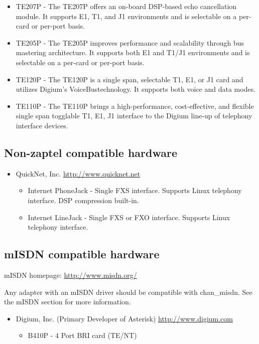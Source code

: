 \begin{itemize}
\begin{itemize}
\begin{itemize}
       \item TE207P - The TE207P offers an on-board DSP-based echo cancellation module. It supports E1, T1, and J1 environments and is selectable on a per-card or per-port basis.
       \item TE205P - The TE205P improves performance and scalability through bus mastering architecture. It supports both E1 and T1/J1 environments and is selectable on a per-card or per-port basis.
       \item TE120P - The TE120P is a single span, selectable T1, E1, or J1 card and utilizes Digium's VoiceBus\texttrademark technology. It supports both voice and data modes.       
       \item TE110P - The TE110P brings a high-performance, cost-effective, and flexible single span togglable T1, E1, J1 interface to the Digium line-up of telephony interface devices.
     \end{itemize}
  \end{itemize}
\end{itemize}

\subsection{Non-zaptel compatible hardware}

\begin{itemize}
  \item QuickNet, Inc. 
        \url{http://www.quicknet.net}
  \begin{itemize}
    \item Internet PhoneJack - Single FXS interface.  Supports Linux telephony
          interface.  DSP compression built-in.

    \item Internet LineJack - Single FXS or FXO interface.  Supports Linux 
          telephony interface.
  \end{itemize}
\end{itemize}

\subsection{mISDN compatible hardware}

mISDN homepage:  \url{http://www.misdn.org/}

Any adapter with an mISDN driver should be compatible with
chan\_misdn. See the mISDN section for more information.

\begin{itemize}
  \item Digium, Inc. (Primary Developer of Asterisk) 
  \url{http://www.digium.com}
  \begin{itemize}
    \item B410P - 4 Port BRI card (TE/NT)
   \end{itemize}
\end{itemize}

